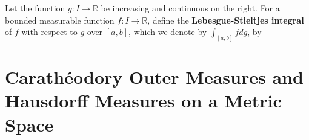 Let the function $g:I\to\mathbb{R}$ be increasing and continuous on the right.
For a bounded measurable function $f:I\to\mathbb{R}$, define the \textbf{Lebesgue-Stieltjes integral} of $f$ with respect to $g$ over $[a,b]$, which we denote by $\int_{[a,b]}fdg$, by

\section{Carath\'eodory Outer Measures and Hausdorff Measures on a Metric Space}
